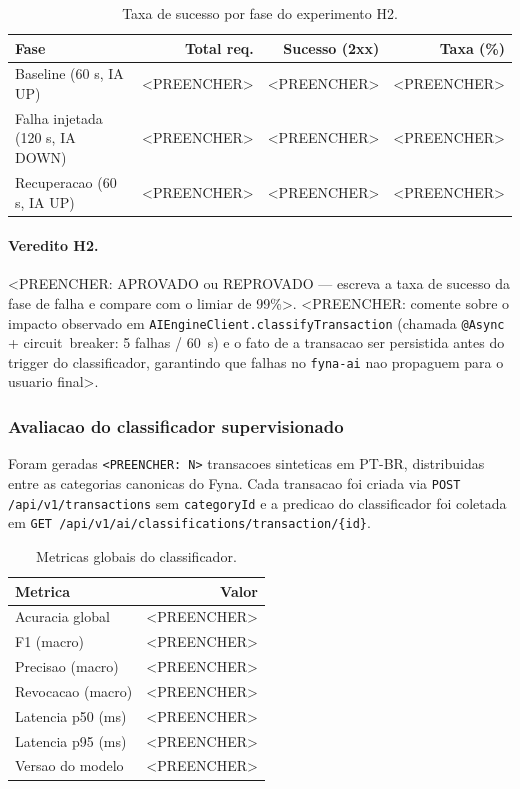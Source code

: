 \begin{table}[!htb]
  \centering
  \caption{Taxa de sucesso por fase do experimento H2.}
  \label{tab:h2-disponibilidade}
  \begin{tabular}{lrrr}
    \hline
    \textbf{Fase} & \textbf{Total req.} & \textbf{Sucesso (2xx)} & \textbf{Taxa (\%)} \\
    \hline
    Baseline (60 s, IA UP)             & <PREENCHER> & <PREENCHER> & <PREENCHER> \\
    Falha injetada (120 s, IA DOWN)    & <PREENCHER> & <PREENCHER> & <PREENCHER> \\
    Recuperacao (60 s, IA UP)          & <PREENCHER> & <PREENCHER> & <PREENCHER> \\
    \hline
  \end{tabular}
\end{table}

\paragraph{Veredito H2.}
<PREENCHER: APROVADO ou REPROVADO — escreva a taxa de sucesso da fase de
falha e compare com o limiar de 99\%>.
<PREENCHER: comente sobre o impacto observado em
\texttt{AIEngineClient.classifyTransaction} (chamada \texttt{@Async} + circuit~breaker:
5 falhas / 60~s) e o fato de a transacao ser persistida antes do trigger
do classificador, garantindo que falhas no \texttt{fyna-ai} nao propaguem
para o usuario final>.

\subsubsection{Avaliacao do classificador supervisionado}
\label{sec:classificador}

Foram geradas \texttt{<PREENCHER: N>} transacoes sinteticas em PT-BR,
distribuidas entre as categorias canonicas do Fyna. Cada transacao foi
criada via \texttt{POST /api/v1/transactions} sem \texttt{categoryId} e a
predicao do classificador foi coletada em
\texttt{GET /api/v1/ai/classifications/transaction/\{id\}}.

\begin{table}[!htb]
  \centering
  \caption{Metricas globais do classificador.}
  \label{tab:classificador-global}
  \begin{tabular}{lr}
    \hline
    \textbf{Metrica}        & \textbf{Valor} \\
    \hline
    Acuracia global         & <PREENCHER> \\
    F1 (macro)              & <PREENCHER> \\
    Precisao (macro)        & <PREENCHER> \\
    Revocacao (macro)       & <PREENCHER> \\
    Latencia p50 (ms)       & <PREENCHER> \\
    Latencia p95 (ms)       & <PREENCHER> \\
    Versao do modelo        & <PREENCHER> \\
    \hline
  \end{tabular}
\end{table}

